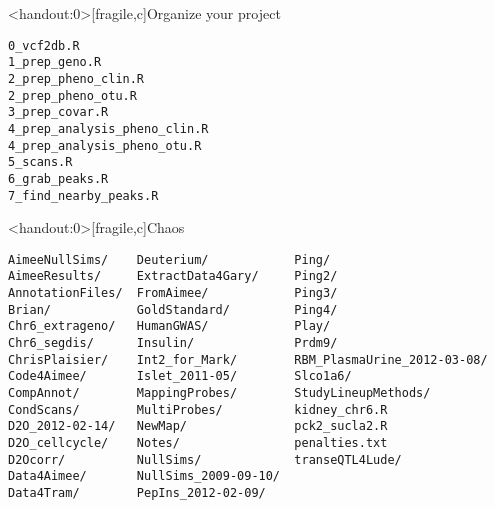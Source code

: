 \documentclass[aspectratio=169,12pt,t]{beamer}
\begin{document}
\begin{frame}<handout:0>[fragile,c]{Organize your project}

\addtocounter{framenumber}{-1}

\begin{center}
\begin{minipage}[c]{10.3cm}
\begin{semiverbatim}
\lstset{basicstyle=\normalsize}
\begin{lstlisting}[linewidth=10.3cm]
0_vcf2db.R
1_prep_geno.R
2_prep_pheno_clin.R
2_prep_pheno_otu.R
3_prep_covar.R
4_prep_analysis_pheno_clin.R
4_prep_analysis_pheno_otu.R
5_scans.R
6_grab_peaks.R
7_find_nearby_peaks.R
\end{lstlisting}
\end{semiverbatim}
\end{minipage}
\end{center}

\end{frame}



\begin{frame}<handout:0>[fragile,c]{Chaos}

\addtocounter{framenumber}{-1}

\begin{center}
\begin{minipage}[c]{11.33cm}
\begin{semiverbatim}
\lstset{basicstyle=\scriptsize}
\begin{lstlisting}[linewidth=11.33cm]
AimeeNullSims/    Deuterium/            Ping/
AimeeResults/     ExtractData4Gary/     Ping2/
AnnotationFiles/  FromAimee/            Ping3/
Brian/            GoldStandard/         Ping4/
Chr6_extrageno/   HumanGWAS/            Play/
Chr6_segdis/      Insulin/              Prdm9/
ChrisPlaisier/    Int2_for_Mark/        RBM_PlasmaUrine_2012-03-08/
Code4Aimee/       Islet_2011-05/        Slco1a6/
CompAnnot/        MappingProbes/        StudyLineupMethods/
CondScans/        MultiProbes/          kidney_chr6.R
D2O_2012-02-14/   NewMap/               pck2_sucla2.R
D2O_cellcycle/    Notes/                penalties.txt
D2Ocorr/          NullSims/             transeQTL4Lude/
Data4Aimee/       NullSims_2009-09-10/
Data4Tram/        PepIns_2012-02-09/
\end{lstlisting}
\end{semiverbatim}
\end{minipage}
\end{center}

\end{frame}
\end{document}
